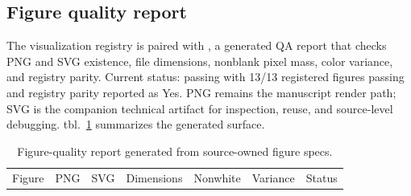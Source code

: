\documentclass[
  english,
]{article}
\begin{document}
\subsection{Figure quality report}\label{figure-quality-report}

The visualization registry is paired with
, a generated QA
report that checks PNG and SVG existence, file dimensions, nonblank
pixel mass, color variance, and registry parity. Current status: passing
with 13/13 registered figures passing and registry parity reported as
Yes. PNG remains the manuscript render path; SVG is the companion
technical artifact for inspection, reuse, and source-level debugging.
tbl.~\ref{tbl:figure_quality} summarizes the generated surface.

\begin{longtable}[]{@{}
  >{\raggedright\arraybackslash}p{}
  >{\raggedright\arraybackslash}p{}
  >{\raggedright\arraybackslash}p{}
  >{\raggedright\arraybackslash}p{}
  >{\raggedright\arraybackslash}p{}
  >{\raggedright\arraybackslash}p{}
  >{\raggedright\arraybackslash}p{}@{}}
\caption{Figure-quality report generated from source-owned figure
specs.}\label{tbl:figure_quality}\tabularnewline
\toprule\noalign{}
\begin{minipage}[b]{\linewidth}\raggedright
Figure
\end{minipage} & \begin{minipage}[b]{\linewidth}\raggedright
PNG
\end{minipage} & \begin{minipage}[b]{\linewidth}\raggedright
SVG
\end{minipage} & \begin{minipage}[b]{\linewidth}\raggedright
Dimensions
\end{minipage} & \begin{minipage}[b]{\linewidth}\raggedright
Nonwhite
\end{minipage} & \begin{minipage}[b]{\linewidth}\raggedright
Variance
\end{minipage} & \begin{minipage}[b]{\linewidth}\raggedright
Status
\end{minipage} \\

\end{longtable}
\end{document}
